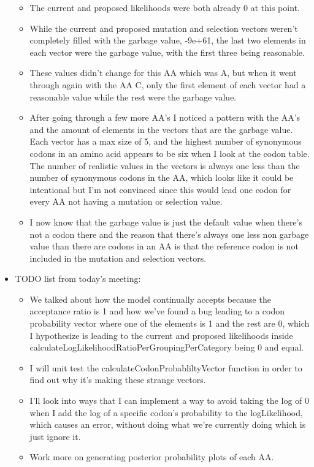 \documentclass[11pt]{labbook}
\begin{document}
\begin{itemize}
\begin{itemize}
                \item The current and proposed likelihoods were both already 0 at this point.
                \item While the current and proposed mutation and selection vectors weren't completely filled with the garbage value, -9e+61, the last two elements in each vector were the garbage value, with the first three being reasonable.
                \item These values didn't change for this AA which was A, but when it went through again with the AA C, only the first element of each vector had a reasonable value while the rest were the garbage value.
                \item After going through a few more AA's I noticed a pattern with the AA's and the amount of elements in the vectors that are the garbage value. Each vector has a max size of 5, and the highest number of synonymous codons in an amino acid appears to be six when I look at the codon table. The number of realistic values in the vectors is always one less than the number of synonymous codons in the AA, which looks like it could be intentional but I'm not convinced since this would lead one codon for every AA not having a mutation or selection value.
                \item I now know that the garbage value is just the default value when there's not a codon there and the reason that there's always one less non garbage value than there are codons in an AA is that the reference codon is not included in the mutation and selection vectors. 
            \end{itemize}
        \item TODO list from today's meeting:
            \begin{itemize}
                \item We talked about how the model continually accepts because the acceptance ratio is 1 and how we've found a bug leading to a codon probability vector where one of the elements is 1 and the rest are 0, which I hypothesize is leading to the current and proposed likelihoods inside calculateLogLikelihoodRatioPerGroupingPerCategory being 0 and equal. 
                \item I will unit test the calculateCodonProbabliltyVector function in order to find out why it's making these strange vectors. 
                \item I'll look into ways that I can implement a way to avoid taking the log of 0 when I add the log of a specific codon's probability to the logLikelihood, which causes an error, without doing what we're currently doing which is just ignore it.
                \item Work more on generating posterior probability plots of each AA.
            \end{itemize}
    \end{itemize}
    
\end{document}
